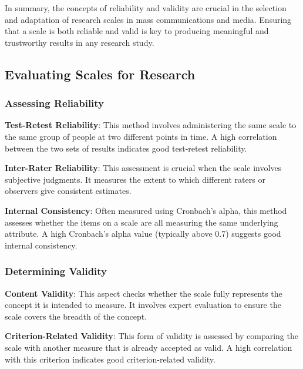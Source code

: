 \documentclass[
]{book}
\begin{document}
In summary, the concepts of reliability and validity are crucial in the selection and adaptation of research scales in mass communications and media. Ensuring that a scale is both reliable and valid is key to producing meaningful and trustworthy results in any research study.

\hypertarget{evaluating-scales-for-research}{%
\subsection*{Evaluating Scales for Research}\label{evaluating-scales-for-research}}

\hypertarget{assessing-reliability}{%
\subsubsection*{Assessing Reliability}\label{assessing-reliability}}

\textbf{Test-Retest Reliability}: This method involves administering the same scale to the same group of people at two different points in time. A high correlation between the two sets of results indicates good test-retest reliability.

\textbf{Inter-Rater Reliability}: This assessment is crucial when the scale involves subjective judgments. It measures the extent to which different raters or observers give consistent estimates.

\textbf{Internal Consistency}: Often measured using Cronbach's alpha, this method assesses whether the items on a scale are all measuring the same underlying attribute. A high Cronbach's alpha value (typically above 0.7) suggests good internal consistency.

\hypertarget{determining-validity}{%
\subsubsection*{Determining Validity}\label{determining-validity}}

\textbf{Content Validity}: This aspect checks whether the scale fully represents the concept it is intended to measure. It involves expert evaluation to ensure the scale covers the breadth of the concept.

\textbf{Criterion-Related Validity}: This form of validity is assessed by comparing the scale with another measure that is already accepted as valid. A high correlation with this criterion indicates good criterion-related validity.
\end{document}
